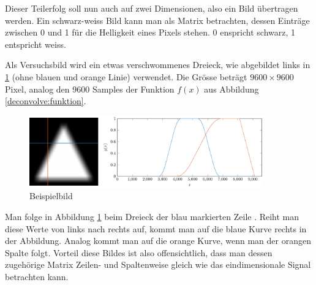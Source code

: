 Dieser Teilerfolg soll nun auch auf zwei Dimensionen, also ein Bild übertragen werden.
Ein schwarz-weiss Bild kann man als Matrix betrachten, dessen Einträge zwischen 0 und 1 für die Helligkeit eines Pixels stehen.
0 enspricht schwarz, 1 entspricht weiss.

Als Versuchsbild wird ein etwas verschwommenes Dreieck, wie abgebildet links in \ref{deconvolve:example} (ohne blauen und orange Linie) verwendet.
Die Grösse beträgt $9600\times9600$ Pixel, analog den 9600 Samples der Funktion $f(x)$ aus Abbildung \ref{deconvolve:funktion}.
\begin{figure}[h]
\centering
\includegraphics[width=0.9\textwidth]{./papers/deconvolve/pictures/dreieck.pdf}
\caption{Beispielbild\label{deconvolve:example}}
\end{figure}

Man folge in Abbildung \ref{deconvolve:example} beim Dreieck der blau markierten \glqq Zeile \grqq{}.
Reiht man diese Werte von links nach rechts auf, kommt man auf die blaue Kurve rechts in der Abbildung.
Analog kommt man auf die orange Kurve, wenn man der orangen \glqq Spalte \grqq{} folgt.
Vorteil diese Bildes ist also offensichtlich, dass man dessen zugehörige Matrix Zeilen- und Spaltenweise gleich wie das eindimensionale Signal betrachten kann.

